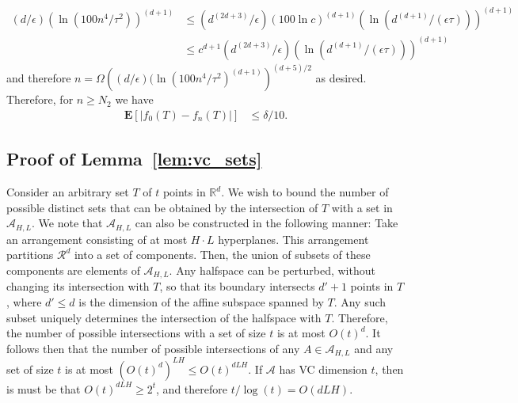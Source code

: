 \documentclass[final,12pt]{colt2018}
\newtheorem{informal theorem}[theorem]{Theorem (informal statement)}
\newcommand{\E}{\mathbf{E}}
\newcommand{\eps}{\epsilon}
\begin{document}
\begin{align*}
(d/\eps) (\ln(100 n^4/\tau^2))^{(d+1)}
&\leq (d^{(2d+3)}/\eps) (100 \ln c)^{(d+1)} \left( \ln(d^{(d+1)}/(\eps\tau)) \right)^{(d+1)} \\
&\leq c^{d+1} (d^{(2d+3)}/\eps) (\ln(d^{(d+1)}/(\eps\tau)) )^{(d+1)}
\end{align*}
and therefore $n = \Omega\left( (d/\eps) (\ln(100 n^4/\tau^2)^{(d+1)} \right)^{(d+5)/2}$ as desired.
Therefore, for $n \geq N_2$ we have
\begin{align}
\E[|f_0(T)-f_n(T)|] &\leq \delta / 10. \label{eq:VC_T}
\end{align}


\subsection{Proof of Lemma~\ref{lem:vc_sets}}
Consider an arbitrary set $T$ of $t$ points in $\mathbb{R}^d$. We wish to bound the number of possible distinct sets that can be obtained by the intersection of $T$ with a set in $\mathcal{A}_{H,L}$.
We note that $\mathcal{A}_{H,L}$ can also be constructed in the following manner: Take an arrangement consisting of at most  {$H \cdot L$} hyperplanes. This arrangement partitions $\mathcal{R}^d$ into a set of components. Then, the union of subsets of these components are elements of $\mathcal{A}_{H,L}$.
Any halfspace can be perturbed, without changing its intersection with $T$, so that its boundary intersects $d'+1$ points in $T$, where $d'\leq d$ is the dimension of the affine subspace spanned by $T$.
Any such subset uniquely determines the intersection of the halfspace with $T$.
Therefore, the number of possible intersections with a set of size $t$ is at most $O(t)^d$.
It follows then that the number of possible intersections of any $A \in \mathcal{A}_{H,L}$ and any set of size $t$ is at most
$(O(t)^d)^{LH} \leq O(t)^{dLH}$.
If $\mathcal{A}$ has VC dimension $t$, then is must be that
$O(t)^{dLH} \geq 2^t$,
and therefore
$t/\log(t) = O(dLH)$.
\end{document}
